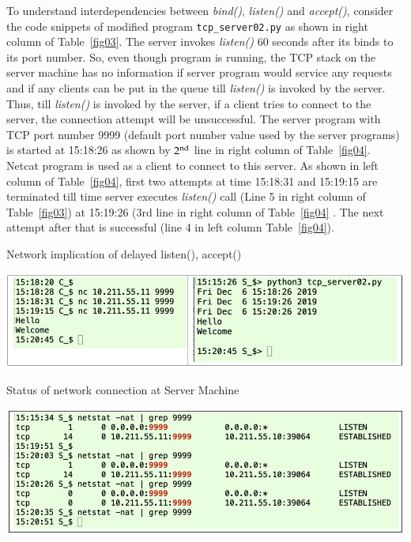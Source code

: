 \begin{multicols}{2}
To understand interdependencies between \textit{bind()}, \textit{listen()} and \textit{accept()}, consider the code snippets of modified program \texttt{tcp\_server02.py} \cite{art1-key11} as shown in right column of Table~\ref{fig03}. The server invokes \textit{listen()} 60 seconds after its binds to its port number. So, even though program is running, the TCP stack on the server machine has no information if server program would service any requests and if any clients can be put in the queue till \textit{listen()} is invoked by the server. Thus, till \textit{listen()} is invoked by the server, if a client tries to connect to the server, the connection attempt will be unsuccessful. The server program with TCP port number 9999 (default port number value used by the server programs) is started at 15:18:26 as shown by $2^{\rm{nd}}$ line in right column of Table~\ref{fig04}. Netcat program \cite{art1-key12} is used as a client to connect to this server. As shown in left column of Table~\ref{fig04}, first two attempts at time 15:18:31 and 15:19:15 are terminated till time server executes \textit{listen()} call (Line 5 in right column of Table~\ref{fig03}) at 15:19:26 (3rd line in right column of Table~\ref{fig04} . The next attempt after that is successful (line 4 in left column Table~\ref{fig04}). 
\end{multicols}

\begin{table}[H]
\centering
\caption{Network implication of delayed listen(), accept()}\label{fig04}
\includegraphics[scale=2.28]{src/Figures/chap1/fig04.jpg}
\end{table}

\begin{table}[H]
\centering
\caption{Status of network connection at Server Machine}\label{fig05}
\includegraphics[scale=2.25]{src/Figures/chap1/fig05.jpg}
\end{table}

